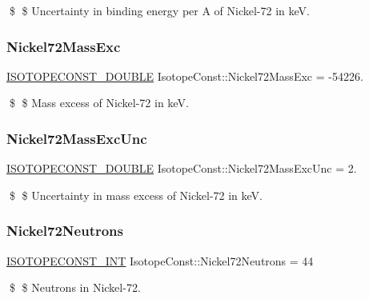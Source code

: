 \$ \$ Uncertainty in binding energy per A of Nickel-\/72 in keV. \mbox{\label{group___isotope_const-_nickel-_ni72_gac3be214ae8f015545fbbbac18348f9ba}} 
\subsubsection{\texorpdfstring{Nickel72\+Mass\+Exc}{Nickel72MassExc}}
{\footnotesize\ttfamily \mbox{\hyperlink{group___isotope_const-_macros_ga8f45a7272ce02c0b4c65c44636ed719a}{I\+S\+O\+T\+O\+P\+E\+C\+O\+N\+S\+T\+\_\+\+D\+O\+U\+B\+LE}} Isotope\+Const\+::\+Nickel72\+Mass\+Exc = -\/54226.}

\$ \$ Mass excess of Nickel-\/72 in keV. \mbox{\label{group___isotope_const-_nickel-_ni72_gaac79ebd188f5212e6a890c0a446de821}} 
\subsubsection{\texorpdfstring{Nickel72\+Mass\+Exc\+Unc}{Nickel72MassExcUnc}}
{\footnotesize\ttfamily \mbox{\hyperlink{group___isotope_const-_macros_ga8f45a7272ce02c0b4c65c44636ed719a}{I\+S\+O\+T\+O\+P\+E\+C\+O\+N\+S\+T\+\_\+\+D\+O\+U\+B\+LE}} Isotope\+Const\+::\+Nickel72\+Mass\+Exc\+Unc = 2.}

\$ \$ Uncertainty in mass excess of Nickel-\/72 in keV. \mbox{\label{group___isotope_const-_nickel-_ni72_ga3aeccb72b0e4944f36a6cef82fbfe2eb}} 
\subsubsection{\texorpdfstring{Nickel72\+Neutrons}{Nickel72Neutrons}}
{\footnotesize\ttfamily \mbox{\hyperlink{group___isotope_const-_macros_ga5f18360b3e99483a35c32d789e62621c}{I\+S\+O\+T\+O\+P\+E\+C\+O\+N\+S\+T\+\_\+\+I\+NT}} Isotope\+Const\+::\+Nickel72\+Neutrons = 44}

\$ \$ Neutrons in Nickel-\/72. \mbox{\label{group___isotope_const-_nickel-_ni72_ga8729da10b7b48af2ddba9bb72472b054}} 
